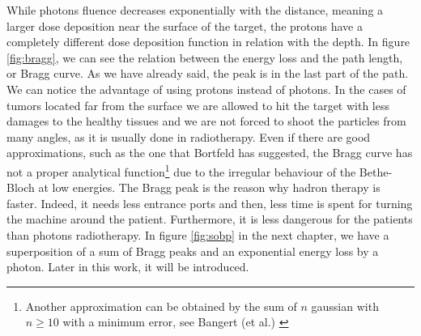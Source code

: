 \documentclass[12pt, a4paper, twoside]{book}
\begin{document}
While photons fluence decreases exponentially with the distance, meaning a larger dose deposition near the surface of the target, the protons have a completely different dose deposition function in relation with the depth.
In figure \ref{fig:bragg}, we can see the relation between the energy loss and the path length, or Bragg curve. As we have already said, the peak is in the last part of the path. We can notice the advantage of using protons instead of photons. In the cases of tumors located far from the surface we are allowed to hit the target with less damages to the healthy tissues and we are not forced to shoot the particles from many angles, as it is usually done in radiotherapy.
Even if there are good approximations, such as the one that Bortfeld has suggested, the Bragg curve has not a proper analytical function\footnote{Another approximation can be obtained by the sum of $n$ gaussian with $n\geq 10$ with a minimum error, see Bangert (et al.) \cite{bang:apm}} due to the irregular behaviour of the Bethe-Bloch at low energies. The Bragg peak is the reason why hadron therapy is faster. Indeed, it needs less entrance ports and then, less time is spent for turning the machine around the patient. Furthermore, it is less dangerous for the patients than photons radiotherapy. 
In figure \ref{fig:sobp} in the next chapter, we have a superposition of a sum of Bragg peaks and an exponential energy loss by a photon. Later in this work, it will be introduced.
\end{document}
